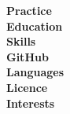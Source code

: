 \documentclass[a4paper,11pt]{article}
\begin{document}
\setlength{\parindent}{0pt}
\thispagestyle{empty}

\begin{paracol}{2}
\setlength{\columnseprule}{0.2pt}
\setlength{\columnsep}{1.5cm}
    \begin{leftcolumn}

        \begin{figure}[h]
        \centering
        \end{figure}

        \begin{flushright}
          \textbf{Practice} \\
          \vspace{64pt}
          \textbf{Education} \\
          \vspace{120pt}
          \textbf{Skills} \\
          \vspace{85pt}
          \textbf{GitHub} \\
          \vspace{20pt}
          \textbf{Languages} \\
          \vspace{28pt}
          \textbf{Licence} \\
          \vspace{45pt}
          \textbf{Interests}




\end{flushright}
\end{leftcolumn}
\end{paracol}
\end{document}
